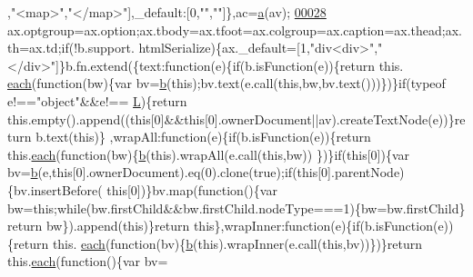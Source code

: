 \begin{DoxyCode}
{      ,\textcolor{stringliteral}{"<map>"},\textcolor{stringliteral}{"</map>"}],\_default:[0,\textcolor{stringliteral}{""},\textcolor{stringliteral}{""}]\},ac=\hyperlink{jquery_8js_aa4d4888597588a84fd5b1184d00c91f3}{a}(av);
\hypertarget{jquery_8js_source_l00028}{}\hyperlink{jquery_8js_adc18d83abfd9f87d396e8fd6b6ac0fe1}{00028} ax.optgroup=ax.option;ax.tbody=ax.tfoot=ax.colgroup=ax.caption=ax.thead;ax.th=ax.td;\textcolor{keywordflow}{if}(!b.support.
      htmlSerialize)\{ax.\_default=[1,\textcolor{stringliteral}{"div<div>"},\textcolor{stringliteral}{"</div>"}]\}b.fn.extend(\{text:\textcolor{keyword}{function}(e)\{\textcolor{keywordflow}{if}(b.isFunction(e))\{\textcolor{keywordflow}{return} this.
      \hyperlink{jquery_8js_a871ff39db627c54c710a3e9909b8234c}{each}(\textcolor{keyword}{function}(bw)\{var bv=\hyperlink{jquery_8js_aa4026ad5544b958e54ce5e106fa1c805}{b}(\textcolor{keyword}{this});bv.text(e.call(\textcolor{keyword}{this},bw,bv.text()))\})\}\textcolor{keywordflow}{if}(typeof e!==\textcolor{stringliteral}{"object"}&&e!==
      \hyperlink{jquery_8js_a38ee4c0b5f4fe2a18d0c783af540d253}{L})\{\textcolor{keywordflow}{return} this.empty().append((\textcolor{keyword}{this}[0]&&\textcolor{keyword}{this}[0].ownerDocument||av).createTextNode(e))\}\textcolor{keywordflow}{return} b.text(\textcolor{keyword}{this})\}
      ,wrapAll:\textcolor{keyword}{function}(e)\{\textcolor{keywordflow}{if}(b.isFunction(e))\{\textcolor{keywordflow}{return} this.\hyperlink{jquery_8js_a871ff39db627c54c710a3e9909b8234c}{each}(\textcolor{keyword}{function}(bw)\{\hyperlink{jquery_8js_aa4026ad5544b958e54ce5e106fa1c805}{b}(\textcolor{keyword}{this}).wrapAll(e.call(\textcolor{keyword}{this},bw))
      \})\}\textcolor{keywordflow}{if}(\textcolor{keyword}{this}[0])\{var bv=\hyperlink{jquery_8js_aa4026ad5544b958e54ce5e106fa1c805}{b}(e,\textcolor{keyword}{this}[0].ownerDocument).eq(0).clone(\textcolor{keyword}{true});\textcolor{keywordflow}{if}(\textcolor{keyword}{this}[0].parentNode)\{bv.insertBefore(\textcolor{keyword}{
      this}[0])\}bv.map(\textcolor{keyword}{function}()\{var bw=\textcolor{keyword}{this};\textcolor{keywordflow}{while}(bw.firstChild&&bw.firstChild.nodeType===1)\{bw=bw.firstChild\}\textcolor{keywordflow}{
      return} bw\}).append(\textcolor{keyword}{this})\}\textcolor{keywordflow}{return} \textcolor{keyword}{this}\},wrapInner:\textcolor{keyword}{function}(e)\{\textcolor{keywordflow}{if}(b.isFunction(e))\{\textcolor{keywordflow}{return} this.
      \hyperlink{jquery_8js_a871ff39db627c54c710a3e9909b8234c}{each}(\textcolor{keyword}{function}(bv)\{\hyperlink{jquery_8js_aa4026ad5544b958e54ce5e106fa1c805}{b}(\textcolor{keyword}{this}).wrapInner(e.call(\textcolor{keyword}{this},bv))\})\}\textcolor{keywordflow}{return} this.\hyperlink{jquery_8js_a871ff39db627c54c710a3e9909b8234c}{each}(\textcolor{keyword}{function}()\{var bv=
}
\end{DoxyCode}
